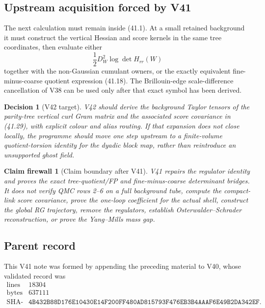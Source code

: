 \documentclass[11pt,oneside]{book}
\newtheorem{firewall}[theorem]{Claim firewall}
\newtheorem{decision}[theorem]{Decision}
\theoremstyle{definition}
\theoremstyle{remark}
\begin{document}
\subsection{Upstream acquisition forced by V41}

The next calculation must remain inside (41.1).  At a small retained
background it must construct the vertical Hessian and score kernels
in the same tree coordinates, then evaluate either
\[
 \frac12D_W^2\log\det H_{rr}(W)                                  \tag{41.36}
\]
together with the non-Gaussian cumulant owners, or the exactly
equivalent fine-minus-coarse quotient expression (41.18).  The
Brillouin-edge scale-difference cancellation of V38 can be used only
after that exact symbol has been derived.

\begin{decision}[V42 target]
\label{dec:e8v41-next}
V42 should derive the background Taylor tensors of the parity-tree
vertical curl Gram matrix and the associated score covariance in
(41.29), with explicit colour and alias routing.  If that expansion
does not close locally, the programme should move one step upstream
to a finite-volume quotient-torsion identity for the dyadic block
map, rather than reintroduce an unsupported ghost field.
\end{decision}

\begin{firewall}[Claim boundary after V41]
\label{fire:e8v41-claim}
V41 repairs the regulator identity and proves the exact
tree-quotient/FP and fine-minus-coarse determinant bridges.  It does
not verify QMC rows 2--6 on a full background tube, compute the
compact-link score covariance, prove the one-loop coefficient for
the actual shell, construct the global RG trajectory, remove the
regulators, establish Osterwalder--Schrader reconstruction, or prove
the Yang--Mills mass gap.
\end{firewall}

\subsection{Parent record}

This V41 note was formed by appending the preceding material to V40,
whose validated record was
\[
\begin{array}{c|c}
\text{lines}&18304\\
\text{bytes}&637111\\
\text{SHA-256}&
\texttt{4B432B88D176E10430E14F200FF480AD815793F476EB3B4AAAF6E49B2DA342EF}.
\end{array}
\]
\end{document}
